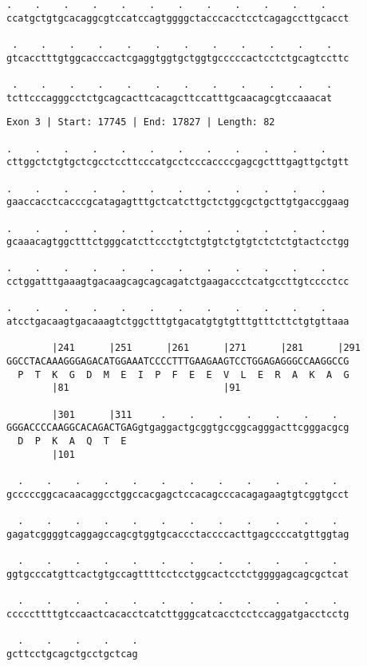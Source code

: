 \documentclass{article}
\begin{document}
\newpage
\begin{Verbatim}[fontfamily=courier]
 .    .    .    .    .    .    .    .    .    .    .    .   
ccatgctgtgcacaggcgtccatccagtggggctacccacctcctcagagccttgcacct

 .    .    .    .    .    .    .    .    .    .    .    .   
gtcacctttgtggcacccactcgaggtggtgctggtgcccccactcctctgcagtccttc

 .    .    .    .    .    .    .    .    .    .    .    .
tcttcccagggcctctgcagcacttcacagcttccatttgcaacagcgtccaaacat
\end{Verbatim}
\newpage
\begin{Verbatim}[fontfamily=courier]
Exon 3 | Start: 17745 | End: 17827 | Length: 82

.    .    .    .    .    .    .    .    .    .    .    .    
cttggctctgtgctcgcctccttcccatgcctcccaccccgagcgctttgagttgctgtt

.    .    .    .    .    .    .    .    .    .    .    .    
gaaccacctcacccgcatagagtttgctcatcttgctctggcgctgcttgtgaccggaag

.    .    .    .    .    .    .    .    .    .    .    .    
gcaaacagtggctttctgggcatcttccctgtctgtgtctgtgtctctctgtactcctgg

.    .    .    .    .    .    .    .    .    .    .    .    
cctggatttgaaagtgacaagcagcagcagatctgaagaccctcatgccttgtcccctcc

.    .    .    .    .    .    .    .    .    .    .    .    
atcctgacaagtgacaaagtctggctttgtgacatgtgtgtttgtttcttctgtgttaaa

        |241      |251      |261      |271      |281      |291
GGCCTACAAAGGGAGACATGGAAATCCCCTTTGAAGAAGTCCTGGAGAGGGCCAAGGCCG
  P  T  K  G  D  M  E  I  P  F  E  E  V  L  E  R  A  K  A  G
        |81                           |91                   

        |301      |311     .    .    .    .    .    .    .  
GGGACCCCAAGGCACAGACTGAGgtgaggactgcggtgccggcagggacttcgggacgcg
  D  P  K  A  Q  T  E                                       
        |101                                                

  .    .    .    .    .    .    .    .    .    .    .    .  
gcccccggcacaacaggcctggccacgagctccacagcccacagagaagtgtcggtgcct

  .    .    .    .    .    .    .    .    .    .    .    .  
gagatcggggtcaggagccagcgtggtgcaccctaccccacttgagccccatgttggtag

  .    .    .    .    .    .    .    .    .    .    .    .  
ggtgcccatgttcactgtgccagttttcctcctggcactcctctggggagcagcgctcat

  .    .    .    .    .    .    .    .    .    .    .    .  
cccccttttgtccaactcacacctcatcttgggcatcacctcctccaggatgacctcctg

  .    .    .    .    .
gcttcctgcagctgcctgctcag
\end{Verbatim}
\end{document}
